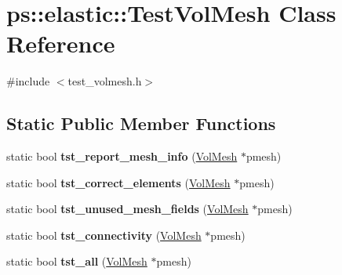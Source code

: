 \hypertarget{classps_1_1elastic_1_1TestVolMesh}{}\section{ps\+:\+:elastic\+:\+:Test\+Vol\+Mesh Class Reference}
\label{classps_1_1elastic_1_1TestVolMesh}


{\ttfamily \#include $<$test\+\_\+volmesh.\+h$>$}

\subsection*{Static Public Member Functions}
\begin{DoxyCompactItemize}
\item 
\hypertarget{classps_1_1elastic_1_1TestVolMesh_ac4aca05e1e19b77a262b7b9d90224481}{}static bool {\bfseries tst\+\_\+report\+\_\+mesh\+\_\+info} (\hyperlink{classps_1_1elastic_1_1VolMesh}{Vol\+Mesh} $\ast$pmesh)\label{classps_1_1elastic_1_1TestVolMesh_ac4aca05e1e19b77a262b7b9d90224481}

\item 
\hypertarget{classps_1_1elastic_1_1TestVolMesh_a25899cb9d6ae6dec5d5dd3290f638436}{}static bool {\bfseries tst\+\_\+correct\+\_\+elements} (\hyperlink{classps_1_1elastic_1_1VolMesh}{Vol\+Mesh} $\ast$pmesh)\label{classps_1_1elastic_1_1TestVolMesh_a25899cb9d6ae6dec5d5dd3290f638436}

\item 
\hypertarget{classps_1_1elastic_1_1TestVolMesh_a4833d63cfdff1b6c5bcd93f415e2074c}{}static bool {\bfseries tst\+\_\+unused\+\_\+mesh\+\_\+fields} (\hyperlink{classps_1_1elastic_1_1VolMesh}{Vol\+Mesh} $\ast$pmesh)\label{classps_1_1elastic_1_1TestVolMesh_a4833d63cfdff1b6c5bcd93f415e2074c}

\item 
\hypertarget{classps_1_1elastic_1_1TestVolMesh_a6f7436bd71970bac4572c10958dbff61}{}static bool {\bfseries tst\+\_\+connectivity} (\hyperlink{classps_1_1elastic_1_1VolMesh}{Vol\+Mesh} $\ast$pmesh)\label{classps_1_1elastic_1_1TestVolMesh_a6f7436bd71970bac4572c10958dbff61}

\item 
\hypertarget{classps_1_1elastic_1_1TestVolMesh_ae780054129c87ad1c9f36ece6729887d}{}static bool {\bfseries tst\+\_\+all} (\hyperlink{classps_1_1elastic_1_1VolMesh}{Vol\+Mesh} $\ast$pmesh)\label{classps_1_1elastic_1_1TestVolMesh_ae780054129c87ad1c9f36ece6729887d}

\end{DoxyCompactItemize}


